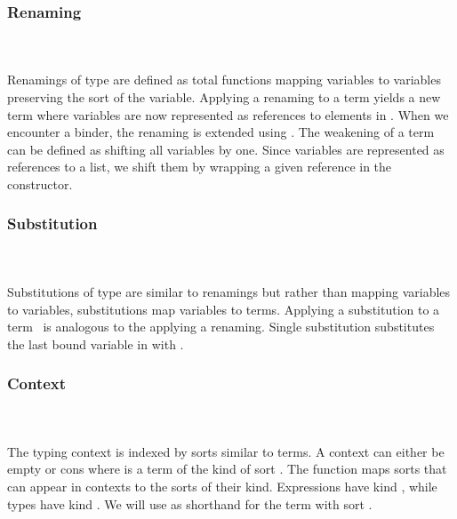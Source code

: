 \subsubsection{Renaming}\hfill\\\\
Renamings  of type    are defined as total functions mapping variables    to variables    preserving the sort  of the variable.
\FRen
Applying a renaming    to a term    yields a new term    where variables are now represented as references    to elements in .
\Fren
When we encounter a binder, the renaming is extended using \Frenext. 
The weakening of a term can be defined as shifting all variables by one.
\Fwk 
Since variables are represented as references to a list, we shift them by wrapping a given reference in the  constructor.

\subsubsection{Substitution}\hfill\\\\
Substitutions  of type    are similar to renamings but rather than mapping variables to variables, substitutions map variables to terms.
\FSub
Applying a substitution to a term \Fsub\ is analogous to the applying a renaming. 
Single substitution  \Data{[}  \Data{]} substitutes the last bound variable in  with .
\Fsubs

\subsubsection{Context}\hfill\\\\
The typing context   is indexed by sorts  similar to terms. 
\FCtx
A context can either be empty  or cons    where  is a term of the kind of sort . The function  maps sorts that can appear in contexts to the sorts of their kind.
\Fkind
Expressions have kind , while types have kind . We will use  as shorthand for the term with sort  .

